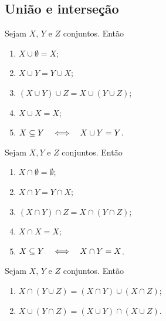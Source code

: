 \subsection*{União e interseção}

\begin{proposition}
Sejam $X$, $Y$ e $Z$ conjuntos. Então
	\begin{enumerate}
	\item $X \cup \emptyset = X$;
	\item $X \cup Y = Y \cup X$;
	\item $(X \cup Y) \cup Z = X \cup (Y \cup Z)$;
	\item $X \cup X = X$;
	\item $X \subseteq Y \quad \Longleftrightarrow \quad X \cup Y = Y$.
	\end{enumerate}
\end{proposition}

\begin{proposition}
Sejam $X,Y$ e $Z$ conjuntos. Então
	\begin{enumerate}
	\item $X \cap \emptyset = \emptyset$;
	\item $X \cap Y = Y \cap X$;
	\item $(X \cap Y) \cap Z = X \cap (Y \cap Z)$;
	\item $X \cap X = X$;
	\item $X \subseteq Y \quad \Longleftrightarrow \quad X \cap Y = X$.
	\end{enumerate}
\end{proposition}

\begin{proposition}
Sejam $X$, $Y$ e $Z$ conjuntos. Então
	\begin{enumerate}
	\item $X \cap (Y \cup Z) = (X \cap Y) \cup (X \cap Z)$;
	\item $X \cup (Y \cap Z) = (X \cup Y) \cap (X \cup Z)$.
	\end{enumerate}
\end{proposition}